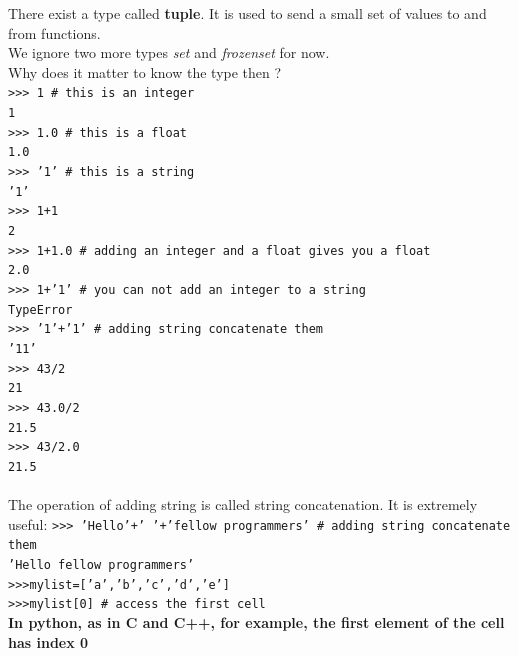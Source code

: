 \documentclass[article,10pt]{scrartcl}
\begin{document}
There exist a type called \textbf{tuple}. It is used to send a small set of values to and from functions.\\

We ignore two more types \textit{set} and \textit{frozenset} for now.\\


Why does it matter to know the type then ?\\
\texttt{>>> 1 \# this is an integer}\\
\texttt{1}\\
\texttt{>>> 1.0 \# this is a float}\\
\texttt{1.0}\\
\texttt{>>> '1' \# this is a string}\\
\texttt{'1'}\\
\texttt{>>> 1+1 }\\
\texttt{2 }\\
\texttt{>>> 1+1.0 \# adding an integer and a float gives you a float}\\
\texttt{2.0 }\\
\texttt{>>> 1+'1' \# you can not add an integer to a string }\\
\texttt{TypeError }\\
\texttt{>>> '1'+'1' \# adding string concatenate them}\\
\texttt{'11' }\\
\texttt{>>> 43/2}\\
\texttt{21}\\
\texttt{>>> 43.0/2}\\
\texttt{21.5}\\
\texttt{>>> 43/2.0}\\
\texttt{21.5}\\
\\
The operation of adding string is called string concatenation. It is extremely useful:
\texttt{>>> 'Hello'+' '+'fellow programmers' \# adding string concatenate them}\\
\texttt{'Hello fellow programmers' }\\

\texttt{>>>mylist=['a','b','c','d','e']}\\
\texttt{>>>mylist[0] \# access the first cell}\\

\textbf{In python, as in C and C++, for example, the first element of the cell has index 0}\\
\end{document}
